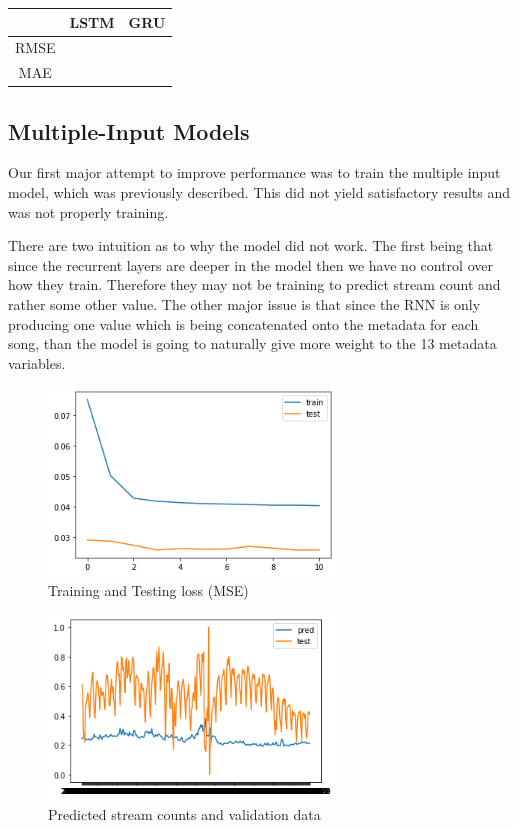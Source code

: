 \documentclass[11pt]{article}
\begin{document}
\begin{tabular}{| c  c  c |}
    \hline
     & LSTM  & GRU \\ 
     \hline 
     RMSE & & \\ 
     MAE & & \\  
     \hline
\end{tabular}

\subsection{Multiple-Input Models}


Our first major attempt to improve performance was to train the multiple input model, which was previously described. This did not yield satisfactory results and was not properly training. %

 There are two intuition as to why the model did not work. The first being that since the recurrent layers are deeper in the model then we have no control over how they train. Therefore they may not be training to predict stream count and rather some other value. The other major issue is that since the RNN is only producing one value which is being concatenated onto the metadata for each song, than the model is going to naturally give more weight to the 13 metadata variables. 
% 
\begin{figure}[h]
    \centering 
    \includegraphics[width=3in]{figs/loss.png}
    \caption{Training and Testing loss (MSE)}
\end{figure}



\begin{figure}[h]
    \centering
    \includegraphics[width=3in ]{figs/stream_count_PLACEHOLDER}
    \caption{Predicted stream counts and validation data }
\end{figure}
\end{document}
